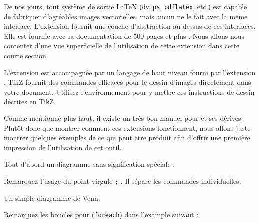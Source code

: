De nos jours, tout système de sortie \LaTeX{} (\texttt{dvips},
\texttt{pdflatex}, etc.) est
capable de fabriquer d'agréables images vectorielles, mais aucun ne le fait
avec la même interface. L'extension  fournit
une couche d'abstraction au-dessus de ces interfaces.
Elle est fournie avec sa documentation
de 500 pages et plus \cite{pgfplot}. Nous allons nous contenter d'une
vue superficielle de l'utilisation de cette extension dans cette
courte section.

L'extension  est accompagnée par un langage de haut niveau fourni par
l'extension . TikZ fournit des commandes
efficaces pour le dessin d'images directement dans votre
document. Utilisez l'environnement  pour y mettre ces
instructions de dessin décrites en TikZ.

Comme mentionné plus haut, il existe un très bon manuel pour  et
ses dérivés. Plutôt donc que montrer comment ces extensions
fonctionnent, nous allons juste montrer quelques exemples de ce qui
peut être produit afin d'offrir une première impression de
l'utilisation de cet outil.

Tout d'abord un diagramme sans signification spéciale :
\begin{example}
\end{example}
Remarquez l'usage du point-virgule \og \texttt{;} \fg. Il sépare les
commandes individuelles.

Un simple diagramme de Venn.
\begin{example}
\end{example}

Remarquez les boucles \og pour \fg (\texttt{foreach}) dans l'example suivant :
\begin{example}
\end{example}

